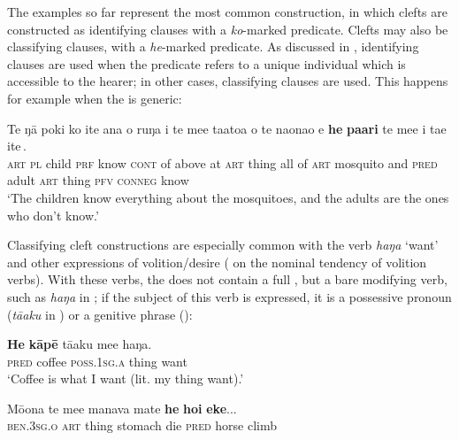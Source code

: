 The examples so far represent the most common construction, in which clefts are constructed as identifying clauses with a \textit{ko}{}-marked predicate. Clefts may also be classifying clauses, with a \textit{he}{}-marked predicate. As discussed in , identifying clauses are used when the predicate refers to a unique individual which is accessible to the hearer; in other cases, classifying clauses are used. This happens for example when the  is generic:

\ea\label{ex:9.44}
\gll Te ŋā poki ko {\ꞌ}ite {\ꞌ}ana o ruŋa i te me{\ꞌ}e ta{\ꞌ}ato{\ꞌ}a o te naonao {\ꞌ}e \textbf{he} \textbf{pa{\ꞌ}ari} {\ob}te me{\ꞌ}e i ta{\ꞌ}e {\ꞌ}ite\,{\cb}. \\
\textsc{art} \textsc{pl} child \textsc{prf} know \textsc{cont} of above at \textsc{art} thing all of \textsc{art} mosquito and \textsc{pred} adult {\db}\textsc{art} thing \textsc{pfv} \textsc{conneg} know \\

\glt 
‘The children know everything about the mosquitoes, and the adults are the ones who don’t know.’ \textstyleExampleref{[R535.159]} 
\z

Classifying cleft constructions are especially common with the verb \textit{haŋa} ‘want’ and other expressions of volition/desire ( on the nominal tendency of volition verbs). With these verbs, the  does not contain a full , but a bare modifying verb, such as \textit{haŋa} in ; if the subject of this verb is expressed, it is a possessive pronoun (\textit{tā{\ꞌ}aku} in ) or a genitive phrase ():

\ea\label{ex:9.45}
\gll \textbf{He} \textbf{kāpē} tā{\ꞌ}aku me{\ꞌ}e haŋa. \\
\textsc{pred} coffee \textsc{poss.1sg.a} thing want \\

\glt 
‘Coffee is what I want (lit. my thing want).’ \textstyleExampleref{[R221.024]} 
\z

\ea\label{ex:9.46}
\gll Mō{\ꞌ}ona te me{\ꞌ}e manava mate \textbf{he} \textbf{hoi} \textbf{eke}... \\
\textsc{ben.3sg.o} \textsc{art} thing stomach die{\rmfnm} \textsc{pred} horse climb \\

